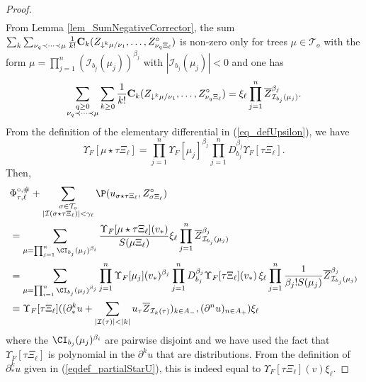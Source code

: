\documentclass[11pt]{preprint}
\newcommand{\mcI}{\mathcal{I}}
\newcommand{\mcT}{\mathcal{T}}
\def\eqref#1{(\ref{#1})}
\newcommand{\bfC}{{\bf C}}
\begin{document}
\begin{proof}
\begin{align*}
		\end{align*}
		From Lemma \ref{lem_SumNegativeCorrector}, the sum $\sum_k\sum_{\nu_q\prec\dots\prec\mu} \frac{1}{k!}\bfC_k(Z_{\downarrow^k\mu/\nu_1},\dots,Z^{\circ}_{\nu_q\Xi_\ell}    )$ is non-zero only for trees $\mu\in\mcT_o$ with the form 
		$\mu= \prod_{j=1}^n  (\mcI_{b_j} (\mu_j))^{\beta_j}$ with $|\mcI_{b_j} (\mu_j)|<0$ and one has
		\begin{equation*}
			\sum_{\substack{q\geq 0 \\ \nu_q\prec\dots\prec\mu  }} \sum_{k\geq 0} \frac{1}{k!} \bfC_k(Z_{\downarrow^k\mu/\nu_1},\dots,Z^{\circ}_{\nu_q\Xi_\ell}    ) = \xi_\ell \prod_{j=1}^n  \overline Z_{\mcI_{b_j}(\mu_j)}^{\beta_j}.
		\end{equation*}
		From the definition of the elementary differential in \eqref{eq_defUpsilon}, we have
		$$
		\Upsilon_F[\mu \star \tau\Xi_\ell] = \prod_{j=1}^n \Upsilon_F[\mu_j]^{\beta_j} \prod_{j=1}^n D_{b_j}^{\beta_j} \Upsilon_F[\tau\Xi_\ell].  
		$$
		Then,
		\begin{align*}\begin{split}
				&	\Phi_{\tau,\ell}^{\circ,\#} + 
				\sum_{\substack{\sigma\in\mcT_o \\ |\mcI(\sigma \star\tau\Xi_\ell)|< \gamma_{\ell}  }} \P(u_{\sigma \star\tau\Xi_\ell}, Z^{\circ}_{\sigma\Xi_\ell})
					\\
					&= \sum_{ \substack{\mu  = \prod_{j=1}^n \CI_{b_j}(\mu_j)^{\beta_i}   }} \frac {\Upsilon_F[\mu\star \tau\Xi_\ell](v_*)}{S(\mu \Xi_{\ell})} 
				\xi_\ell \prod_{j=1}^n  \overline Z_{\mcI_{b_j}(\mu_j)}^{\beta_j}
				\\
				&  = \sum_{ \substack{\mu  = \prod_{i=1}^n \CI_{b_j}(\mu_j)^{\beta_j}   }}  \prod_{j=1}^n \Upsilon_F[\mu_j](v_*)^{\beta_j} \prod_{j=1}^n D_{b_j}^{\beta_j} \Upsilon_F[\tau\Xi_\ell](v_*) \,  
				\xi_\ell \prod_{j=1}^n \frac{1}{\beta_j ! S(\mu_j)}  \overline Z_{\mcI_{b_j}(\mu_j)}^{\beta_j}
				\\
				&= \Upsilon_F[\tau\Xi_\ell](     (\partial_*^{k} u + \sum_{|\mcI(\tau)|< |k|} u_\tau \overline{Z}_{\mcI_{k}(\tau) } )_{k \in A_-}, (\partial^{n} u)_{n \in A_+}) \xi_\ell
		\end{split}\end{align*}
		where the $\CI_{b_j}(\mu_j)^{\beta_i}$ are pairwise disjoint and  we have used the fact that $\Upsilon_F[\tau\Xi_\ell]$ is polynomial in the $ \partial^k u $ that are distributions.
		From the definition of $\partial_*^{k}u$ given in \eqref{eqdef_partialStarU}, this is indeed equal to $\Upsilon_F[\tau\Xi_\ell](v)\xi_\ell$.
	\end{proof}
	
\end{document}
